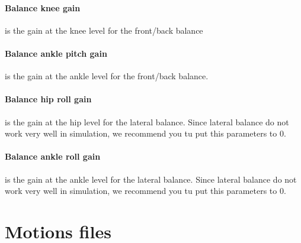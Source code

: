 \documentclass[a4paper, 12pt]{article}  		%
\begin{document}
\paragraph*{Balance knee gain}
is the gain at the knee level for the front/back balance

\paragraph*{Balance ankle pitch gain}
is the gain at the ankle level for the front/back balance.

\paragraph*{Balance hip roll gain}
is the gain at the hip level for the lateral balance. Since lateral balance do not work very well in simulation, we recommend you tu put this parameters to 0.

\paragraph*{Balance ankle roll gain}
is the gain at the ankle level for the lateral balance. Since lateral balance do not work very well in simulation, we recommend you tu put this parameters to 0.



\section{Motions files} \label{sec:Motions}
\end{document}
